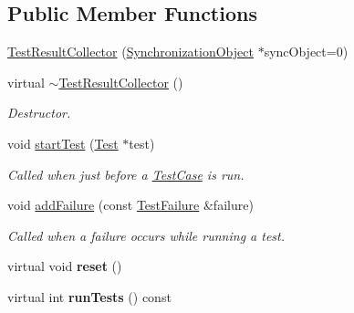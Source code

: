 \subsection*{Public Member Functions}
\begin{DoxyCompactItemize}
\item 
\hyperlink{class_test_result_collector_a8bc475c91000fca9f0ed34e105577767}{Test\+Result\+Collector} (\hyperlink{class_synchronized_object_1_1_synchronization_object}{Synchronization\+Object} $\ast$sync\+Object=0)
\item 
virtual \hyperlink{class_test_result_collector_a2e905ace0bcb819bbe190faf16ea1aed}{$\sim$\+Test\+Result\+Collector} ()\hypertarget{class_test_result_collector_a2e905ace0bcb819bbe190faf16ea1aed}{}\label{class_test_result_collector_a2e905ace0bcb819bbe190faf16ea1aed}

\begin{DoxyCompactList}\small\item\em Destructor. \end{DoxyCompactList}\item 
void \hyperlink{class_test_result_collector_a647d3e05ffc8fcf7023fea2f7c9f95cb}{start\+Test} (\hyperlink{class_test}{Test} $\ast$test)\hypertarget{class_test_result_collector_a647d3e05ffc8fcf7023fea2f7c9f95cb}{}\label{class_test_result_collector_a647d3e05ffc8fcf7023fea2f7c9f95cb}

\begin{DoxyCompactList}\small\item\em Called when just before a \hyperlink{class_test_case}{Test\+Case} is run. \end{DoxyCompactList}\item 
void \hyperlink{class_test_result_collector_af53cbc55621f0eb0dc02d8b0203ea321}{add\+Failure} (const \hyperlink{class_test_failure}{Test\+Failure} \&failure)
\begin{DoxyCompactList}\small\item\em Called when a failure occurs while running a test. \end{DoxyCompactList}\item 
virtual void {\bfseries reset} ()\hypertarget{class_test_result_collector_a1e20981cc1e127942154a643639d4740}{}\label{class_test_result_collector_a1e20981cc1e127942154a643639d4740}

\item 
virtual int {\bfseries run\+Tests} () const \hypertarget{class_test_result_collector_ac832652158423deae9c2815ba616e836}{}\label{class_test_result_collector_ac832652158423deae9c2815ba616e836}


\end{DoxyCompactItemize}
